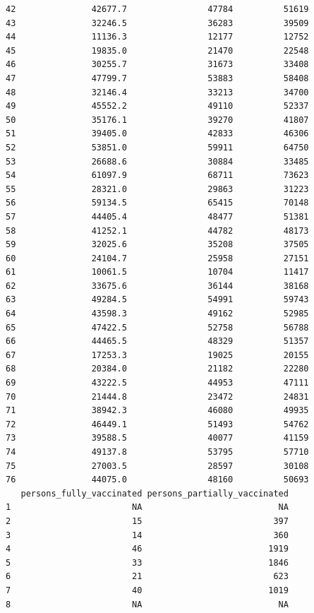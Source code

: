 \documentclass[
  letterpaper,
  DIV=11,
  numbers=noendperiod]{scrartcl}
\begin{document}
\begin{verbatim}
42               42677.7                47784          51619
43               32246.5                36283          39509
44               11136.3                12177          12752
45               19835.0                21470          22548
46               30255.7                31673          33408
47               47799.7                53883          58408
48               32146.4                33213          34700
49               45552.2                49110          52337
50               35176.1                39270          41807
51               39405.0                42833          46306
52               53851.0                59911          64750
53               26688.6                30884          33485
54               61097.9                68711          73623
55               28321.0                29863          31223
56               59134.5                65415          70148
57               44405.4                48477          51381
58               41252.1                44782          48173
59               32025.6                35208          37505
60               24104.7                25958          27151
61               10061.5                10704          11417
62               33675.6                36144          38168
63               49284.5                54991          59743
64               43598.3                49162          52985
65               47422.5                52758          56788
66               44465.5                48329          51357
67               17253.3                19025          20155
68               20384.0                21182          22280
69               43222.5                44953          47111
70               21444.8                23472          24831
71               38942.3                46080          49935
72               46449.1                51493          54762
73               39588.5                40077          41159
74               49137.8                53795          57710
75               27003.5                28597          30108
76               44075.0                48160          50693
   persons_fully_vaccinated persons_partially_vaccinated
1                        NA                           NA
2                        15                          397
3                        14                          360
4                        46                         1919
5                        33                         1846
6                        21                          623
7                        40                         1019
8                        NA                           NA

\end{verbatim}
\end{document}
